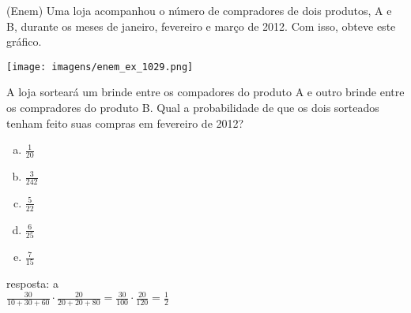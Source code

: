 \begin{ex}
   (Enem) Uma loja acompanhou o número de compradores de dois produtos, A e B, durante os meses de janeiro, fevereiro e março de 2012. Com isso, obteve este gráfico.
     \begin{center}
       \texttt{[image: imagens/enem\_ex\_1029.png]}
     \end{center}
   A loja sorteará um brinde entre os compadores do produto A e outro brinde entre os compradores do produto B. Qual a probabilidade de que os dois sorteados tenham feito suas compras em fevereiro de 2012?
  
    \begin{enumerate} [(a)]
        \item $\frac{1}{20}$
        \item $\frac{3}{242}$
        \item $\frac{5}{22}$
        \item $\frac{6}{25}$
        \item $\frac{7}{15}$
    \end{enumerate}
     \begin{sol}
     resposta: a \\
     $\frac{30}{10+30+60}\cdot\frac{20}{20+20+80}=\frac{30}{100}\cdot\frac{20}{120}=\frac{1}{2}$
     \end{sol}
 \end{ex}